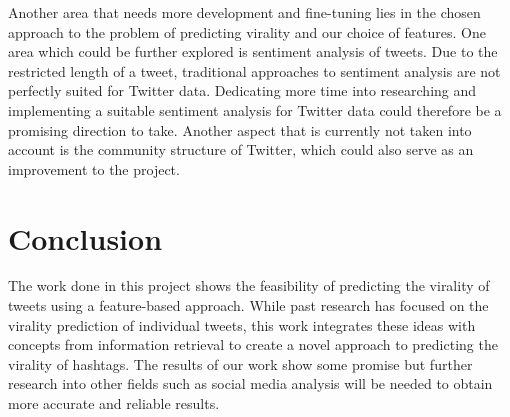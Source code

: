 Another area that needs more development and fine-tuning lies in the chosen approach to the problem of predicting virality and our choice of features. 
One area which could be further explored is sentiment analysis of tweets. Due to the restricted length of a tweet, traditional approaches to sentiment analysis are not perfectly suited for Twitter data. Dedicating more time into researching and implementing a suitable sentiment analysis for Twitter data could therefore be a promising direction to take. 
Another aspect that is currently not taken into account is the community structure of Twitter, which could also serve as an improvement to the project. 




\section{Conclusion}

The work done in this project shows the feasibility of predicting the virality of tweets using a feature-based approach. While past research has focused on the virality prediction of individual tweets, this work integrates these ideas with concepts from information retrieval to create a novel approach to predicting the virality of hashtags. The results of our work show some promise but further research into other fields such as social media analysis will be needed to obtain more accurate and reliable results.

